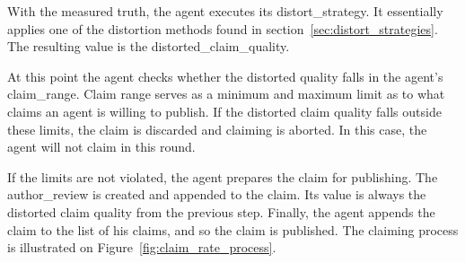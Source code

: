 \documentclass[%
    ]{\PathToTumTemplate/thesis/tum_thesis}
\begin{document}
With the measured truth, the agent executes its \gls{distort_strategy}.
It essentially applies one of the distortion methods found in section~\ref{sec:distort_strategies}.
The resulting value is the \gls{distorted_claim_quality}.

At this point the agent checks whether the distorted quality falls in the agent's \gls{claim_range}.
Claim range serves as a minimum and maximum limit as to what claims an agent is willing to publish.
If the distorted claim quality falls outside these limits, the claim is discarded and claiming is aborted.
In this case, the agent will not claim in this round.

If the limits are not violated, the agent prepares the claim for publishing.
The \gls{author_review} is created and appended to the claim.
Its value is always the distorted claim quality from the previous step.
Finally, the agent appends the claim to the list of his claims, and so the claim is published.
The claiming process is illustrated on Figure~\ref{fig:claim_rate_process}.
\end{document}
